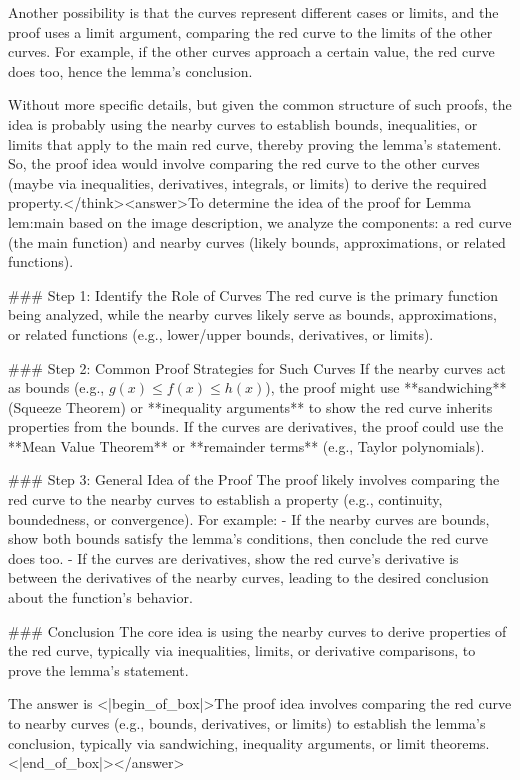 Another possibility is that the curves represent different cases or limits, and the proof uses a limit argument, comparing the red curve to the limits of the other curves. For example, if the other curves approach a certain value, the red curve does too, hence the lemma's conclusion. 

Without more specific details, but given the common structure of such proofs, the idea is probably using the nearby curves to establish bounds, inequalities, or limits that apply to the main red curve, thereby proving the lemma's statement. So, the proof idea would involve comparing the red curve to the other curves (maybe via inequalities, derivatives, integrals, or limits) to derive the required property.</think><answer>To determine the idea of the proof for Lemma lem:main based on the image description, we analyze the components: a red curve (the main function) and nearby curves (likely bounds, approximations, or related functions).  

### Step 1: Identify the Role of Curves  
The red curve is the primary function being analyzed, while the nearby curves likely serve as bounds, approximations, or related functions (e.g., lower/upper bounds, derivatives, or limits).  

### Step 2: Common Proof Strategies for Such Curves  
If the nearby curves act as bounds (e.g., \( g(x) \leq f(x) \leq h(x) \)), the proof might use **sandwiching** (Squeeze Theorem) or **inequality arguments** to show the red curve inherits properties from the bounds. If the curves are derivatives, the proof could use the **Mean Value Theorem** or **remainder terms** (e.g., Taylor polynomials).  

### Step 3: General Idea of the Proof  
The proof likely involves comparing the red curve to the nearby curves to establish a property (e.g., continuity, boundedness, or convergence). For example:  
- If the nearby curves are bounds, show both bounds satisfy the lemma’s conditions, then conclude the red curve does too.  
- If the curves are derivatives, show the red curve’s derivative is between the derivatives of the nearby curves, leading to the desired conclusion about the function’s behavior.  

### Conclusion  
The core idea is using the nearby curves to derive properties of the red curve, typically via inequalities, limits, or derivative comparisons, to prove the lemma’s statement.  

The answer is <|begin_of_box|>The proof idea involves comparing the red curve to nearby curves (e.g., bounds, derivatives, or limits) to establish the lemma’s conclusion, typically via sandwiching, inequality arguments, or limit theorems.<|end_of_box|></answer>